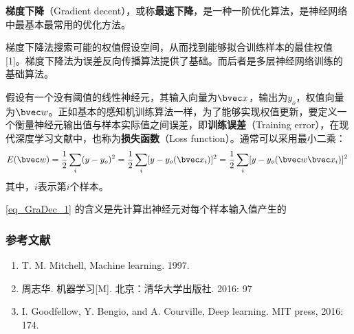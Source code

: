
\textbf{梯度下降}（Gradient decent），或称\textbf{最速下降}，是一种一阶优化算法，是神经网络中最基本最常用的优化方法。

梯度下降法搜索可能的权值假设空间，从而找到能够拟合训练样本的最佳权值 [1]。梯度下降法为误差反向传播算法提供了基础。而后者是多层神经网络训练的基础算法。

假设有一个没有阈值的线性神经元，其输入向量为$\bvec x$，输出为$y_o$，权值向量为$\bvec w$。正如基本的感知机训练算法一样，为了能够实现权值更新，要定义一个衡量神经元输出值与样本实际值之间误差，即\textbf{训练误差}（Training error），在现代深度学习文献中，也称为\textbf{损失函数}（Loss function）。通常可以采用最小二乘：
\begin{equation}\label{eq_GraDec_1}
E(\bvec w)=\frac{1}{2}\sum_i(y-y_o)^2=\frac{1}{2}\sum_i[y-y_o(\bvec x_i)]^2=\frac{1}{2}\sum_i[y-y_o(\bvec w \bvec x_i)]^2~
\end{equation}
其中，$i$表示第$i$个样本。

\autoref{eq_GraDec_1} 的含义是先计算出神经元对每个样本输入值产生的





\subsubsection{参考文献}
\begin{enumerate}
\item T. M. Mitchell, Machine learning. 1997.
\item 周志华. 机器学习[M]. 北京：清华大学出版社. 2016: 97
\item I. Goodfellow, Y. Bengio, and A. Courville, Deep learning. MIT press, 2016: 174.
\end{enumerate}